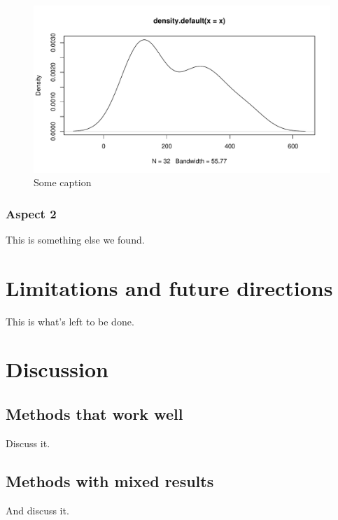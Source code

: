 \documentclass[a4paper,man,floatsintext,natbib]{apa6}\usepackage[]{graphicx}\usepackage[]{xcolor}
\makeatletter
\def\maxwidth{ %
  \ifdim\Gin@nat@width>\linewidth
    \linewidth
  \else
    \Gin@nat@width
  \fi
}
\newenvironment{knitrout}{}{} %
\newcommand{\pathBIB}{./bib}
\makeatother
\begin{document}
	\begin{figure}
	\centering
\begin{knitrout}
\color{fgcolor}

{\centering \includegraphics[width=\maxwidth]{figure/plot-pdf-1} 

}


\end{knitrout}
		\caption{\label{fig:dist} Some caption }
	\end{figure}

\subsubsection{Aspect 2}

	This is something else we found.
    
\section{Limitations and future directions}

	This is what's left to be done.
    
\section{Discussion}

\subsection{Methods that work well}

	Discuss it.

\subsection{Methods with mixed results}

	And discuss it.
    
    \setcounter{secnumdepth}{4}

    



\end{document}

